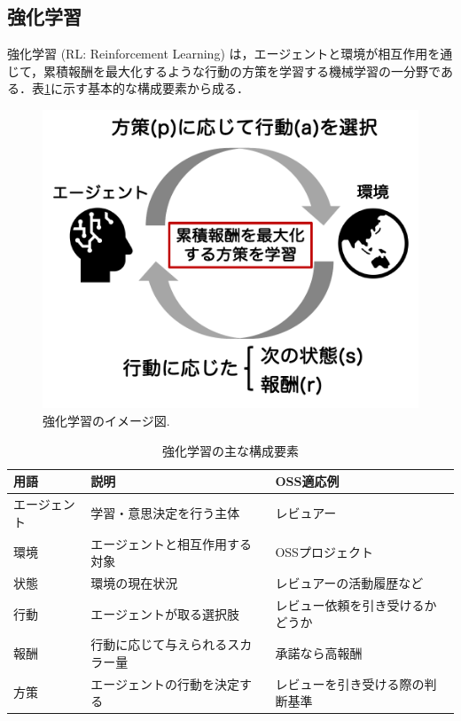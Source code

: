 \documentclass[submit,techrep,noauthor]{ipsj}
\begin{document}
\subsection{強化学習}
強化学習 (RL: Reinforcement Learning) は，エージェントと環境が相互作用を通じて，累積報酬を最大化するような行動の方策を学習する機械学習の一分野である．表\ref{tab:RL}に示す基本的な構成要素から成る．
\begin{figure}[t]
    \centering
    \includegraphics[width=1.0\linewidth]{./Hashimoto_fig/RL.pdf}
    \caption{強化学習のイメージ図.}
    \label{fig:RL}
\end{figure}




\begin{table}[h]
\centering 
\caption{強化学習の主な構成要素}
\label{tab:RL} 
\begingroup 
\setlength{\tabcolsep}{4pt} 
\footnotesize 
    \begin{tabularx}{\columnwidth}{lXX} 
    \toprule
    用語 & 説明 & OSS適応例 \\
    \midrule
    エージェント & 学習・意思決定を行う主体 & レビュアー \\
    環境 & エージェントと相互作用する対象 & OSSプロジェクト \\
    状態 & 環境の現在状況 & レビュアーの活動履歴など \\
    行動 & エージェントが取る選択肢 & レビュー依頼を引き受けるかどうか \\
    報酬 & 行動に応じて与えられるスカラー量 & 承諾なら高報酬 \\
    方策 & エージェントの行動を決定する & レビューを引き受ける際の判断基準 \\
    \bottomrule
    \end{tabularx}
\endgroup
\end{table}
\end{document}
